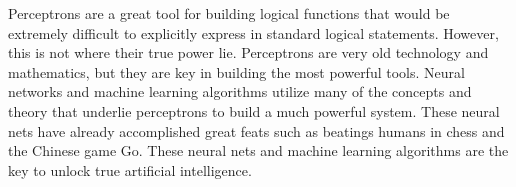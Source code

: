 Perceptrons are a great tool for building logical functions that would be extremely difficult to explicitly express in standard logical statements. However, this is not where their true power lie. Perceptrons are very old technology and mathematics, but they are key in building the most powerful tools. Neural networks and machine learning algorithms utilize many of the concepts and theory that underlie perceptrons to build a much powerful system. These neural nets have already accomplished great feats such as beatings humans in chess and the Chinese game Go. These neural nets and machine learning algorithms are the key to unlock true artificial intelligence.